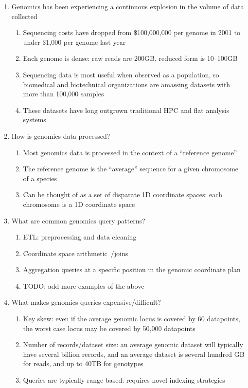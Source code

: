\documentclass{vldb}
\begin{document}
\begin{enumerate}
\item Genomics has been experiencing a continuous explosion in the volume of data
collected~\cite{stephens15}
\begin{enumerate}
\item Sequencing costs have dropped from \$100,000,000 per genome in 2001 to under
\$1,000 per genome last year
\item Each genome is dense: raw reads are 200GB, reduced form is 10--100GB
\item Sequencing data is most useful when observed as a population, so biomedical
and biotechnical organizations are amassing datasets with more than 100,000
samples~\cite{lek16}
\item These datasets have long outgrown traditional HPC and flat analysis systems
\end{enumerate}
\item How is genomics data processed?
\begin{enumerate}
\item Most genomics data is processed in the context of a ``reference genome''
\item The reference genome is the ``average'' sequence for a given chromosome
of a species
\item Can be thought of as a set of disparate 1D coordinate spaces: each
chromosome is a 1D coordinate space
\end{enumerate}
\item What are common genomics query patterns?
\begin{enumerate}
\item ETL: preprocessing and data cleaning~\cite{massie13, nothaft15avocado}
\item Coordinate space arithmetic~\cite{quinlan10}/joins~\cite{nothaft15}
\item Aggregation queries at a specific position in the genomic coordinate plan
\item TODO: add more examples of the above
\end{enumerate}
\item What makes genomics queries expensive/difficult?
\begin{enumerate}
\item Key skew: even if the average genomic locus is covered by 60 datapoints,
the worst case locus may be covered by 50,000 datapoints~\cite{pinard06}
\item Number of records/dataset size: an average genomic dataset will typically have several
billion records, and an average dataset is several hundred GB for reads, and up to
40TB for genotypes
\item Queries are typically range based: requires novel indexing strategies
\end{enumerate}
\end{enumerate}
\end{document}
